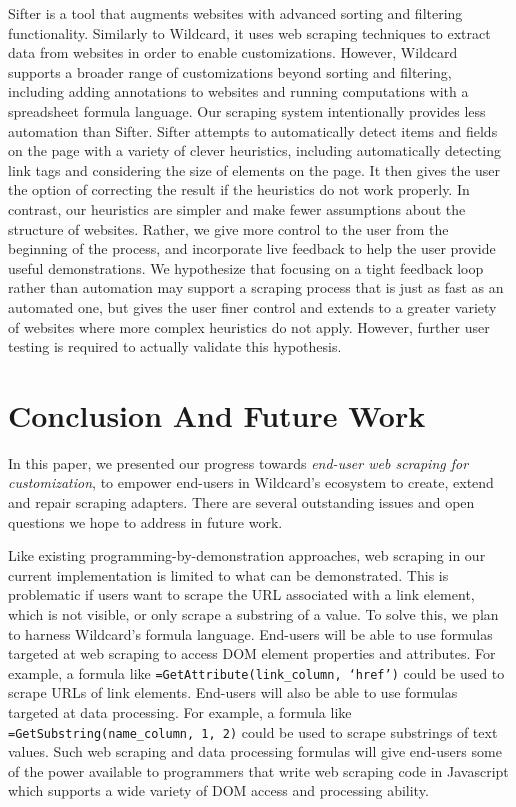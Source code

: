 \documentclass[sigconf,10pt]{acmart}
\begin{document}
Sifter \citep{huynh2006} is a tool that augments websites with advanced
sorting and filtering functionality. Similarly to Wildcard, it uses web
scraping techniques to extract data from websites in order to enable
customizations. However, Wildcard supports a broader range of
customizations beyond sorting and filtering, including adding
annotations to websites and running computations with a spreadsheet
formula language. Our scraping system intentionally provides less
automation than Sifter. Sifter attempts to automatically detect items
and fields on the page with a variety of clever heuristics, including
automatically detecting link tags and considering the size of elements
on the page. It then gives the user the option of correcting the result
if the heuristics do not work properly. In contrast, our heuristics are
simpler and make fewer assumptions about the structure of websites.
Rather, we give more control to the user from the beginning of the
process, and incorporate live feedback to help the user provide useful
demonstrations. We hypothesize that focusing on a tight feedback loop
rather than automation may support a scraping process that is just as
fast as an automated one, but gives the user finer control and extends
to a greater variety of websites where more complex heuristics do not
apply. However, further user testing is required to actually validate
this hypothesis.

\hypertarget{sec:conclusion}{%
\section{Conclusion And Future Work}\label{sec:conclusion}}

In this paper, we presented our progress towards \emph{end-user web
scraping for customization}, to empower end-users in Wildcard's
ecosystem to create, extend and repair scraping adapters. There are
several outstanding issues and open questions we hope to address in
future work.

Like existing programming-by-demonstration approaches, web scraping in
our current implementation is limited to what can be demonstrated. This
is problematic if users want to scrape the URL associated with a link
element, which is not visible, or only scrape a substring of a value. To
solve this, we plan to harness Wildcard's formula language. End-users
will be able to use formulas targeted at web scraping to access DOM
element properties and attributes. For example, a formula like
\texttt{=GetAttribute(link\_column,\ ‘href’)} could be used to scrape
URLs of link elements. End-users will also be able to use formulas
targeted at data processing. For example, a formula like
\texttt{=GetSubstring(name\_column,\ 1,\ 2)} could be used to scrape
substrings of text values. Such web scraping and data processing
formulas will give end-users some of the power available to programmers
that write web scraping code in Javascript which supports a wide variety
of DOM access and processing ability.
\end{document}
